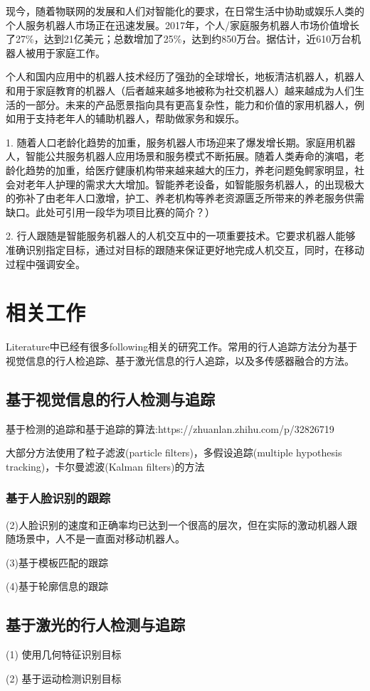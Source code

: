 现今，随着物联网的发展和人们对智能化的要求，在日常生活中协助或娱乐人类的个人服务机器人市场正在迅速发展。2017年，个人/家庭服务机器人市场价值增长了27\%，达到21亿美元；总数增加了25\%，达到约850万台。据估计，近610万台机器人被用于家庭工作。

个人和国内应用中的机器人技术经历了强劲的全球增长，地板清洁机器人，机器人和用于家庭教育的机器人（后者越来越多地被称为社交机器人）越来越成为人们生活的一部分。未来的产品愿景指向具有更高复杂性，能力和价值的家用机器人，例如用于支持老年人的辅助机器人，帮助做家务和娱乐。

  1. 随着人口老龄化趋势的加重，服务机器人市场迎来了爆发增长期。家庭用机器人，智能公共服务机器人应用场景和服务模式不断拓展。随着人类寿命的演唱，老龄化趋势的加重，给医疗健康机构带来越来越大的压力，养老问题兔鳄家明显，社会对老年人护理的需求大大增加。智能养老设备，如智能服务机器人，的出现极大的弥补了由老年人口激增，护工、养老机构等养老资源匮乏所带来的养老服务供需缺口。此处可引用一段华为项目比赛的简介？）

   2. 行人跟随是智能服务机器人的人机交互中的一项重要技术。它要求机器人能够准确识别指定目标，通过对目标的跟随来保证更好地完成人机交互，同时，在移动过程中强调安全。


\section{相关工作}

Literature中已经有很多following相关的研究工作。常用的行人追踪方法分为基于视觉信息的行人检追踪、基于激光信息的行人追踪，以及多传感器融合的方法。

\subsection{基于视觉信息的行人检测与追踪}
基于检测的追踪和基于追踪的算法:https://zhuanlan.zhihu.com/p/32826719

大部分方法使用了粒子滤波(particle filters)，多假设追踪(multiple hypothesis tracking)，卡尔曼滤波(Kalman filters)的方法

\cite{mucientes2006multiple}

\subsubsection{基于人脸识别的跟踪}

   (2)人脸识别的速度和正确率均已达到一个很高的层次，但在实际的激动机器人跟随场景中，人不是一直面对移动机器人。

   (3)基于模板匹配的跟踪

   (4)基于轮廓信息的跟踪



\subsection{基于激光的行人检测与追踪}
  (1) 使用几何特征识别目标
   
  (2) 基于运动检测识别目标

